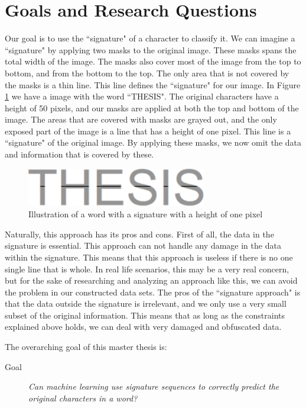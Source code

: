 \section{Goals and Research Questions}
\label{sec:goals_and_research_questions}
Our goal is to use the ``signature" of a character to classify it. We can imagine a ``signature" by applying two masks to the original image. These masks spans the total width of the image. The masks also cover most of the image from the top to bottom, and from the bottom to the top. The only area that is not covered by the masks is a thin line. This line defines the ``signature" for our image. In Figure \ref{fig:thesis-signature} we have a image with the word ``THESIS". The original characters have a height of 50 pixels, and our masks are applied at both the top and bottom of the image. The areas that are covered with masks are grayed out, and the only exposed part of the image is a line that has a height of one pixel. This line is a ``signature" of the original image. By applying these masks, we now omit the data and information that is covered by these.

\begin{figure}[ht]
    \centering
    \includegraphics[width=0.7\textwidth]{fig/chapter1/signature.png}
    \caption{Illustration of a word with a signature with a height of one pixel}
    \label{fig:thesis-signature}
\end{figure}

Naturally, this approach has its pros and cons. First of all, the data in the signature is essential. This approach can not handle any damage in the data within the signature. This means that this approach is useless if there is no one single line that is whole. In real life scenarios, this may be a very real concern, but for the sake of researching and analyzing an approach like this, we can avoid the problem in our constructed data sets. The pros of the ``signature approach" is that the data outside the signature is irrelevant, and we only use a very small subset of the original information. This means that as long as the constraints explained above holds, we can deal with very damaged and obfuscated data.

The overarching goal of this master thesis is:

\begin{description}
    \item[Goal]{\textit{Can machine learning use signature sequences to correctly predict the original characters in a word?}}
\end{description}

